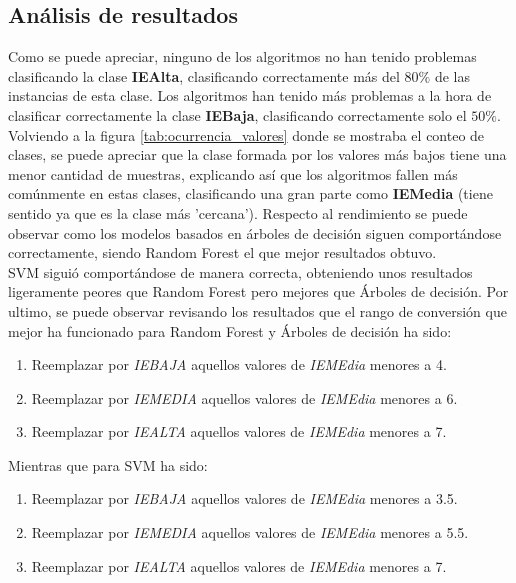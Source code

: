 \subsection{Análisis de resultados}
Como se puede apreciar, ninguno de los algoritmos no han tenido problemas clasificando la clase \textbf{IEAlta}, clasificando correctamente más del $80\%$ de las instancias de esta clase.
Los algoritmos han tenido más problemas a la hora de clasificar correctamente la clase \textbf{IEBaja}, clasificando correctamente solo el $50\%$. Volviendo a la figura \ref{tab:ocurrencia_valores} donde se mostraba el conteo de clases, se puede apreciar que la clase formada por los valores más bajos tiene una menor cantidad de muestras, explicando así que los algoritmos fallen más comúnmente en estas clases, clasificando una gran parte como \textbf{IEMedia} (tiene sentido ya que es la clase más 'cercana').
\linebreak
Respecto al rendimiento se puede observar como los modelos basados en árboles de decisión siguen comportándose correctamente, siendo Random Forest el que mejor resultados obtuvo. \\
SVM siguió comportándose de manera correcta, obteniendo unos resultados ligeramente peores que Random Forest pero mejores que Árboles de decisión.
\linebreak
Por ultimo, se puede observar revisando los resultados que el rango de conversión que mejor ha funcionado para Random Forest y Árboles de decisión ha sido:
\begin{enumerate}
    \item Reemplazar por \textit{IEBAJA} aquellos valores de \textit{IEMEdia} menores a 4.
    \item Reemplazar por \textit{IEMEDIA} aquellos valores de \textit{IEMEdia} menores a 6.
    \item Reemplazar por \textit{IEALTA} aquellos valores de \textit{IEMEdia} menores a 7.
\end{enumerate}
Mientras que para SVM ha sido:
\begin{enumerate}
    \item Reemplazar por \textit{IEBAJA} aquellos valores de \textit{IEMEdia} menores a 3.5.
    \item Reemplazar por \textit{IEMEDIA} aquellos valores de \textit{IEMEdia} menores a 5.5.
    \item Reemplazar por \textit{IEALTA} aquellos valores de \textit{IEMEdia} menores a 7.
\end{enumerate}

